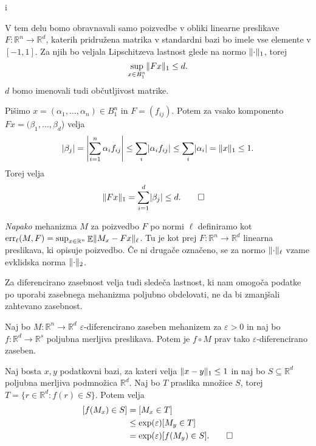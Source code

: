 i\documentclass[mat1]{fmfdelo}
\DeclarePairedDelimiter{\abs}{\lvert}{\rvert}
\DeclarePairedDelimiter{\norm}{\lVert}{\rVert}
\newcommand{\R}{\mathbb R}
\let\P\relax \DeclareMathOperator*{\P}{\mathbb P}
\DeclareMathOperator*{\E}{\mathbb E}
\DeclareMathOperator*{\err}{err}
\newcommand{\query}{F: \R^n \to \R^d}
\begin{document}
\begin{trditev} \label{sensitivity}
    V tem delu bomo obravnavali samo poizvedbe v obliki linearne preslikave $\query$, katerih pridružena matrika v standardni bazi bo imele vse elemente v $[-1,1]$. Za njih bo veljala Lipschitzeva lastnost glede na normo $\norm{\cdot}_1$, torej
    \begin{equation*}
        \sup_{x \in B_1^n} \norm{Fx}_1 \leq d.
    \end{equation*}
    $d$ bomo imenovali tudi občutljivost matrike.
\end{trditev}
\begin{dokaz}
    Pišimo $x=(\alpha_1,\dots,\alpha_n) \in B_1^n$ in $F=(f_{ij})$. Potem za vsako komponento $Fx=(\beta_1,\dots,\beta_d$) velja
    \begin{equation*}
        \abs{\beta_j} = \abs*{\sum_{i=1}^n \alpha_i f_{ij}} \leq \sum_i \abs{\alpha_i f_{ij}} \leq \sum_i \abs{\alpha_i} = \norm{x}_1 \leq 1.
    \end{equation*}
    Torej velja
    \begin{align*}
        \norm{Fx}_1 &= \sum_{i=1}^d \abs{\beta_j} \leq d. \qedhere
    \end{align*}
\end{dokaz}

\begin{definicija} \label{2error}
	{\em Napako} mehanizma $M$ za poizvedbo $F$ po normi $\ell$ definiramo kot $\err_\ell(M, F)=\sup_{x \in \R^n} \E \norm{M_x-Fx}_\ell$. Tu je kot prej $F: \R^n \to \R^d$ linearna preslikava, ki opisuje poizvedbo. Če ni drugače označeno, se za normo $\norm{\cdot}_\ell$ vzame evklidska norma  $\norm{\cdot}_2$.
\end{definicija}


Za diferencirano zasebnost velja tudi sledeča lastnost, ki nam omogoča podatke po uporabi zasebnega mehanizma poljubno obdelovati, ne da bi zmanjšali zahtevano zasebnost.
\begin{izrek} \label{postprocessing}
    Naj bo $M: \R^n \to \R^d$ $\varepsilon$-diferencirano zaseben mehanizem za $\varepsilon>0$ in naj bo $f: \R^d \to \R^s$ poljubna merljiva preslikava. Potem je $f \circ M$ prav tako $\varepsilon$-diferencirano zaseben.
\end{izrek}
\begin{dokaz}
    Naj bosta $x,y$ podatkovni bazi, za kateri velja $\norm{x-y}_1 \leq 1$ in naj bo $S \subseteq \R^d$ poljubna merljiva podmnožica $\R^d$. Naj bo $T$ praslika množice $S$, torej $T= \{ r\in \R^d : f(r) \in S \}$. Potem velja
    \begin{align*}
        \P [f(M_x) \in S] &= \P [M_x \in T] \\
        &\leq \exp(\varepsilon) \P [M_y \in T] \\
        &= \exp(\varepsilon) \P [f(M_y) \in S]. \qedhere
    \end{align*}
\end{dokaz}
\end{document}
